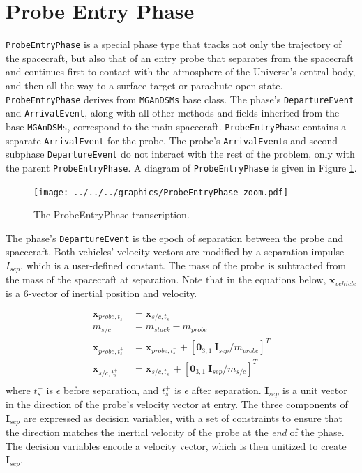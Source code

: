 \section{Probe Entry Phase}
\label{sec:ProbeEntryPhase}
\texttt{ProbeEntryPhase} is a special phase type that tracks not only the trajectory of the spacecraft, but also that of an entry probe that separates from the spacecraft and continues first to contact with the atmosphere of the Universe's central body, and then all the way to a surface target or parachute open state. \texttt{ProbeEntryPhase} derives from  \texttt{MGAnDSMs} base class. The phase's \texttt{DepartureEvent} and \texttt{ArrivalEvent}, along with all other methods and fields inherited from the base \texttt{MGAnDSMs}, correspond to the main spacecraft. \texttt{ProbeEntryPhase} contains a separate \texttt{ArrivalEvent} for the probe. The probe's \texttt{ArrivalEvent}s and second-subphase \texttt{DepartureEvent} do not interact with the rest of the problem, only with the parent \texttt{ProbeEntryPhase}. A diagram of \texttt{ProbeEntryPhase} is given in Figure \ref{fig:ProbeEntryPhase}.

\begin{figure}[ht]
	\centering
	\texttt{[image: ../../../graphics/ProbeEntryPhase\_zoom.pdf]}
	\caption{\label{fig:ProbeEntryPhase} The ProbeEntryPhase transcription.}
\end{figure}

The phase's \texttt{DepartureEvent} is the epoch of separation between the probe and spacecraft. Both vehicles' velocity vectors are modified by a separation impulse $I_{sep}$, which is a user-defined constant. The mass of the probe is subtracted from the mass of the spacecraft at separation. Note that in the equations below, $\mathbf{x}_{vehicle}$ is a 6-vector of inertial position and velocity.

\begin{align}
\mathbf{x}_{probe,t_s^-} &= \mathbf{x}_{s/c,t_s^-}\\
m_{s/c} &= m_{stack} - m_{probe}\\
\mathbf{x}_{probe,t_s^+} &= \mathbf{x}_{probe,t_s^-} + \left[\mathbf{0}_{3,1} \: \mathbf{I}_{sep}/m_{probe}\right]^T\\
\mathbf{x}_{s/c,t_s^+} &= \mathbf{x}_{s/c,t_s^-} + \left[\mathbf{0}_{3,1} \: \mathbf{I}_{sep}/m_{s/c}\right]^T\\
\end{align}
%
where $t_s^-$ is $\epsilon$ before separation, and $t_s^+$ is $\epsilon$ after separation. $\mathbf{I}_{sep}$ is a unit vector in the direction of the probe's velocity vector at entry. The three components of $\mathbf{I}_{sep}$ are expressed as decision variables, with a set of constraints to ensure that the direction matches the inertial velocity of the probe at the \textit{end} of the phase. The decision variables encode a velocity vector, which is then unitized to create $\mathbf{I}_{sep}$.

